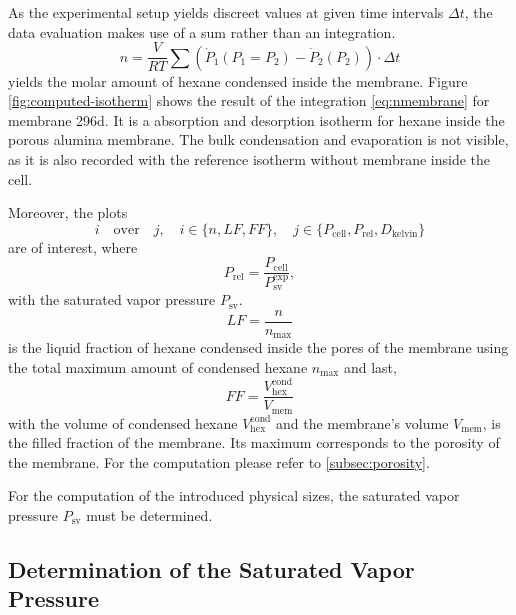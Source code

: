 \documentclass[../thesis.tex]{subfiles}
\begin{document}
        As the experimental setup yields discreet values at given time intervals $\Delta t$, the data evaluation makes use of a sum rather than an integration.
        \begin{equation}
            n = \frac{V}{RT} \sum \left( \dot{P}_1 ( P_1 = P_2) - \dot{P}_2(P_2) \right) \cdot \Delta t
            \label{eq:nmembrane}
        \end{equation}
        yields the molar amount of hexane condensed inside the membrane. Figure \cref{fig:computed-isotherm} shows the result of the integration \cref{eq:nmembrane} for membrane 296d. It is a absorption and desorption isotherm for hexane inside the porous alumina membrane. The bulk condensation and evaporation is not visible, as it is also recorded with the reference isotherm without membrane inside the cell.
        \medskip

        Moreover, the plots
        \begin{equation}
            i \quad \mathrm{over} \quad j,\quad i\in \{n,LF,FF\}, \quad j\in \{P_\mathrm{cell},P_\mathrm{rel},D_\mathrm{kelvin}\}
        \end{equation}
        are of interest, where
        \begin{equation}
            P_\mathrm{rel} = \frac{P_\mathrm{cell}}{P_\mathrm{sv}^\mathrm{exp}},
        \end{equation}
        with the saturated vapor pressure $P_\mathrm{sv}$.
        \begin{equation}
            LF = \frac{n}{n_\mathrm{max}}
        \end{equation}
        is the liquid fraction of hexane condensed inside the pores of the membrane using the total maximum amount of condensed hexane $n_\mathrm{max}$ and last,
        \begin{equation}
            FF = \frac{V_\mathrm{hex}^\mathrm{cond}}{V_\mathrm{mem}}
        \end{equation}
        with the volume of condensed hexane $V_\mathrm{hex}^\mathrm{cond}$ and the membrane's volume $V_\mathrm{mem}$, is the filled fraction of the membrane. Its maximum corresponds to the porosity of the membrane. For the computation please refer to \cref{subsec:porosity}.

        For the computation of the introduced physical sizes, the saturated vapor pressure $P_\mathrm{sv}$ must be determined.


        \subsection{Determination of the Saturated Vapor Pressure}
\end{document}
